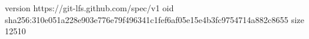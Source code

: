 version https://git-lfs.github.com/spec/v1
oid sha256:310e051a228e903e776e79f496341c1fef6af05e15e4b3fc9754714a882c8655
size 12510
